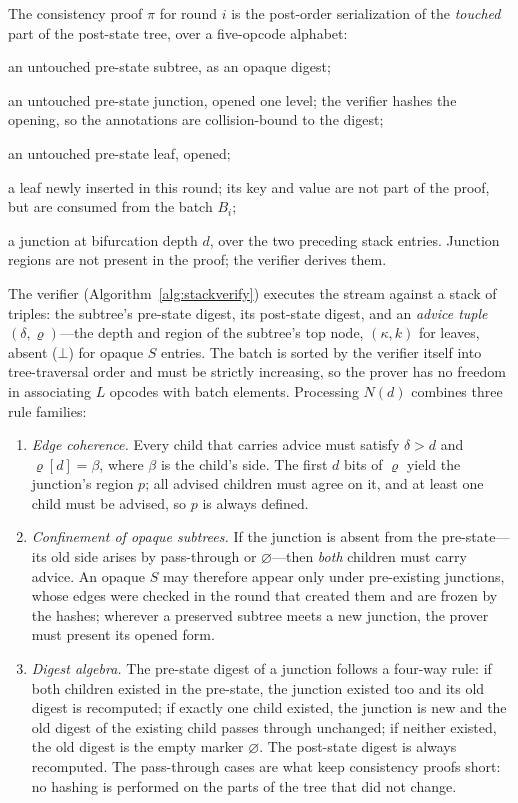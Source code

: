 \documentclass[11pt]{article}
\begin{document}
The consistency proof $\pi$ for round $i$ is the post-order serialization of the \emph{touched} part of the post-state tree, over a five-opcode alphabet:
\begin{description}[nosep]
  \item[$S(c)$:] an untouched pre-state subtree, as an opaque digest;
  \item[$O(d', p', c_l, c_r)$:] an untouched pre-state junction, opened one level; the verifier hashes the opening, so the annotations are collision-bound to the digest;
  \item[$O_L(k', v')$:] an untouched pre-state leaf, opened;
  \item[$L$:] a leaf newly inserted in this round; its key and value are not part of the proof, but are consumed from the batch $B_i$;
  \item[$N(d)$:] a junction at bifurcation depth $d$, over the two preceding stack entries. Junction regions are not present in the proof; the verifier derives them.
\end{description}

The verifier (Algorithm~\ref{alg:stackverify}) executes the stream against a stack of triples: the subtree's pre-state digest, its post-state digest, and an \emph{advice tuple} $(\delta, \varrho)$---the depth and region of the subtree's top node, $(\kappa, k)$ for leaves, absent ($\bot$) for opaque $S$ entries. The batch is sorted by the verifier itself into tree-traversal order and must be strictly increasing, so the prover has no freedom in associating $L$ opcodes with batch elements. Processing $N(d)$ combines three rule families:
\begin{enumerate}[nosep]
  \item \emph{Edge coherence.} Every child that carries advice must satisfy $\delta > d$ and $\varrho[d] = \beta$, where $\beta$ is the child's side. The first $d$ bits of $\varrho$ yield the junction's region $p$; all advised children must agree on it, and at least one child must be advised, so $p$ is always defined.
  \item \emph{Confinement of opaque subtrees.} If the junction is absent from the pre-state---its old side arises by pass-through or $\varnothing$---then \emph{both} children must carry advice. An opaque $S$ may therefore appear only under pre-existing junctions, whose edges were checked in the round that created them and are frozen by the hashes; wherever a preserved subtree meets a new junction, the prover must present its opened form.
  \item \emph{Digest algebra.} The pre-state digest of a junction follows a four-way rule: if both children existed in the pre-state, the junction existed too and its old digest is recomputed; if exactly one child existed, the junction is new and the old digest of the existing child passes through unchanged; if neither existed, the old digest is the empty marker $\varnothing$. The post-state digest is always recomputed. The pass-through cases are what keep consistency proofs short: no hashing is performed on the parts of the tree that did not change.
\end{enumerate}
\end{document}
